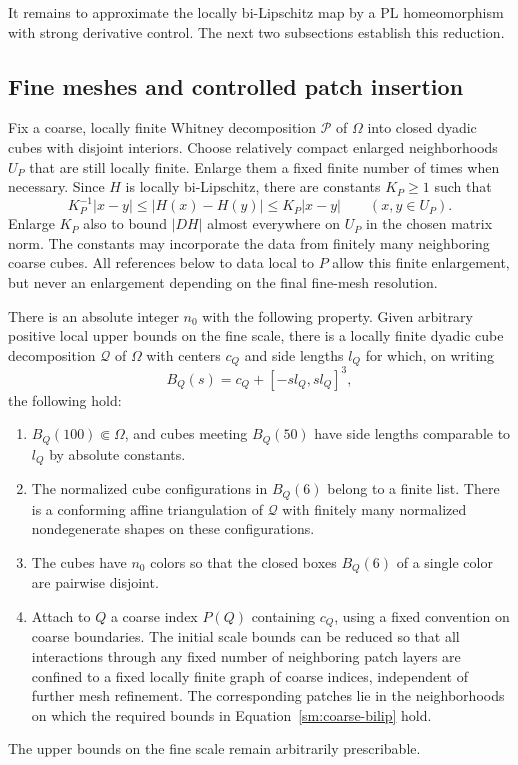 It remains to approximate the locally bi-Lipschitz map by a PL
homeomorphism with strong derivative control.  The next two
subsections establish this reduction.

\subsection{Fine meshes and controlled patch insertion}

Fix a coarse, locally finite Whitney decomposition $\mathcal P$ of
$\Omega$ into closed dyadic cubes with disjoint interiors.  Choose
relatively compact enlarged neighborhoods $U_P$ that are still locally
finite.  Enlarge them a fixed finite number of times when necessary.
Since $H$ is locally bi-Lipschitz, there are constants $K_P\ge1$ such
that
\begin{equation}
 \label{sm:coarse-bilip}
 K_P^{-1}|x-y|\le |H(x)-H(y)|\le K_P|x-y|
 \qquad(x,y\in U_P).
\end{equation}
Enlarge $K_P$ also to bound $|DH|$ almost everywhere on $U_P$ in the
chosen matrix norm.  The constants may incorporate the data from finitely many neighboring
coarse cubes.  All references below to data local to $P$ allow this
finite enlargement, but never an enlargement depending on the final
fine-mesh resolution.

\begin{lemma}
\label{sm:mesh}
There is an absolute integer $n_0$ with the following property.
Given arbitrary positive local upper bounds on the fine scale, there
is a locally finite dyadic cube decomposition $\mathcal Q$ of $\Omega$
with centers $c_Q$ and side lengths $l_Q$ for which, on writing
\begin{equation}
 \label{sm:patch-box}
 B_Q(s)=c_Q+[-s l_Q,s l_Q]^3,
\end{equation}
the following hold:
\begin{enumerate}[label=\textup{(\roman*)}]
 \item $B_Q(100)\Subset\Omega$, and cubes meeting $B_Q(50)$ have
 side lengths comparable to $l_Q$ by absolute constants.
 \item The normalized cube configurations in $B_Q(6)$ belong to a
 finite list.  There is a conforming affine triangulation of
 $\mathcal Q$ with finitely many normalized nondegenerate shapes
 on these configurations.
 \item The cubes have $n_0$ colors so that the closed boxes $B_Q(6)$
 of a single color are pairwise disjoint.
 \item Attach to $Q$ a coarse index $P(Q)$ containing $c_Q$, using
 a fixed convention on coarse boundaries.  The initial scale
 bounds can be reduced so that all interactions through any fixed
 number of neighboring patch layers are confined to a fixed
 locally finite graph of coarse indices, independent of further
 mesh refinement.  The corresponding patches lie in the
 neighborhoods on which the required bounds in
 Equation~\eqref{sm:coarse-bilip} hold.
\end{enumerate}
The upper bounds on the fine scale remain arbitrarily prescribable.
\end{lemma}

